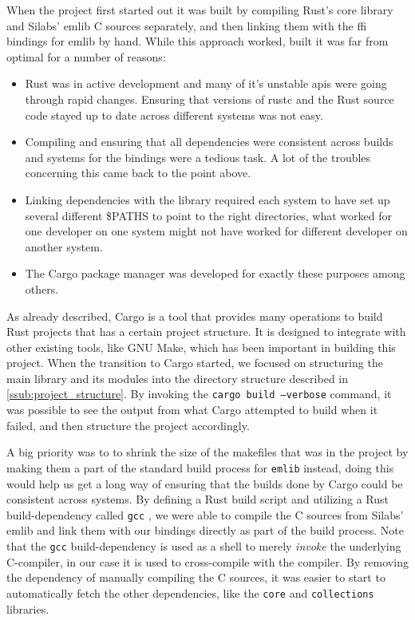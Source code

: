 When the project first started out it was built by compiling Rust's core library and Silabs' emlib C sources separately, and then linking them with the \gls{ffi} bindings for emlib by hand.
While this approach worked, built it was far from optimal for a number of reasons:

\begin{itemize}
    \item Rust was in active development and many of it's unstable \glspl{api} were going through rapid changes. Ensuring that versions of rustc and the Rust source code stayed up to date across different systems was not easy.
    \item Compiling and ensuring that all dependencies were consistent across builds and systems for the bindings were a tedious task. A lot of the troubles concerning this came back to the point above.
    \item Linking dependencies with the library required each system to have set up several different \$PATHS to point to the right directories, what worked for one developer on one system might not have worked for different developer on another system.
    \item The Cargo package manager was developed for exactly these purposes among others.
\end{itemize}

As already described, Cargo is a tool that provides many operations to build Rust projects that has a certain project structure.
It is designed to integrate with other existing tools, like GNU Make, which has been important in  building this project.
When the transition to Cargo started, we focused on structuring the main library and its modules into the directory structure described in \autoref{ssub:project_structure}.
By invoking the \texttt{cargo build --verbose} command, it was possible to see the output from what Cargo attempted to build when it failed, and then structure the project accordingly.

A big priority was to to shrink the size of the makefiles that was in the project by making them a part of the standard build process for \texttt{emlib} instead, doing this would help us get a long way of ensuring that the builds done by Cargo could be consistent across systems.
By defining a Rust build script and utilizing a Rust build-dependency called \texttt{gcc} \cite{web:cargo_gcc}, we were able to compile the C sources from Silabs' emlib and link them with our bindings directly as part of the build process.
Note that the \texttt{gcc} build-dependency is used as a shell to merely \emph{invoke} the underlying C-compiler, in our case it is used to cross-compile with the \armgcc compiler.
By removing the dependency of manually compiling the C sources, it was easier to start to automatically fetch the other dependencies, like the \texttt{core} and \texttt{collections} libraries.


